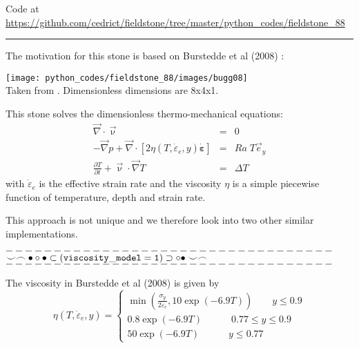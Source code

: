 

\begin{center}
Code at \url{https://github.com/cedrict/fieldstone/tree/master/python_codes/fieldstone_88}
\end{center}

\par\noindent\rule{\textwidth}{0.4pt}

The motivation for this stone is based on Burstedde et al (2008) \cite{bugg08}:

\begin{center}
\texttt{[image: python\_codes/fieldstone\_88/images/bugg08]}\\
{\captionfont Taken from \cite{bugg08}. Dimensionless dimensions are 8x4x1.}
\end{center}

This stone solves the dimensionless thermo-mechanical equations:
\begin{eqnarray}
\vec\nabla\cdot\vec\upnu &=& 0 \\
-\vec\nabla p + \vec\nabla \cdot [ 2 \eta(T,\dot{\varepsilon}_e,y) \dot{\bm \varepsilon} ] &=& Ra\; T \vec{e}_y \\
\frac{\partial T}{\partial t} + \vec\upnu \cdot \vec\nabla T &=& \Delta T
\end{eqnarray}
with $\dot{\varepsilon}_e$ is the effective strain rate and the viscosity $\eta$ is a simple
piecewise function of temperature, depth and strain rate.

This approach is not unique and we therefore look into two other similar implementations.

\begin{center}
$----------------------------------$\\
$\smile \frown \bullet \circ \bullet \subset ( {\tt viscosity\_model=1} ) \supset \circ \bullet \smile \frown$\\
$----------------------------------$
\end{center}

The viscosity in Burstedde et al (2008) \cite{bugg08} is given by 
\[
\eta(T,\dot{\varepsilon}_e,y) =
\left\{
\begin{array}{c}
\min \left(  \frac{\sigma_y}{2 \dot{\varepsilon}_e} , 10\exp(-6.9T)  \right) \qquad y\le 0.9 \\
0.8 \exp(-6.9T) \qquad\quad  0.77\le y \le 0.9 \\
50 \exp(-6.9T) \qquad\quad y \le 0.77 
\end{array}
\right.
\]

